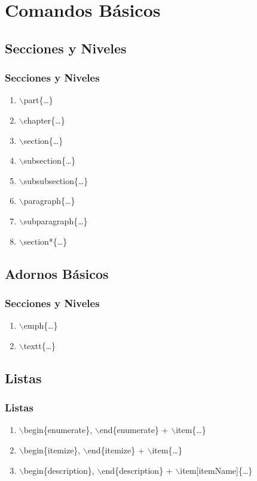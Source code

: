 \documentclass[a4paper,slidestop,xcolor=pst,dvips,blue]{beamer}
\newcommand{\command}[1]{$\backslash$#1\{\dots\}}
\newcommand{\envCommand}[1]{$\backslash$begin\{#1\}, $\backslash$end\{#1\}}
\begin{document}
\section{Comandos Básicos}

\subsection{Secciones y Niveles}

\begin{frame}[c]
    \frametitle{Secciones y Niveles}
    \begin{enumerate}
        \item \command{part}
        \item \command{chapter}
        \item \command{section}
        \item \command{subsection}
        \item \command{subsubsection}
        \item \command{paragraph}
        \item \command{subparagraph}
        \item \command{section*}
    \end{enumerate}
\end{frame}

\subsection{Adornos Básicos}

\begin{frame}[c]
    \frametitle{Secciones y Niveles}
    \begin{enumerate}[<+->]
        \item \command{emph}
        \item \command{textt}
    \end{enumerate}
\end{frame}

\subsection{Listas}

\begin{frame}[c]
    \frametitle{Listas}
    \begin{enumerate}[<+->]
        \item \envCommand{enumerate} + \command{item}
        \item \envCommand{itemize} + \command{item}
        \item \envCommand{description} + \command{item[itemName]}
    \end{enumerate}
\end{frame}
\end{document}
